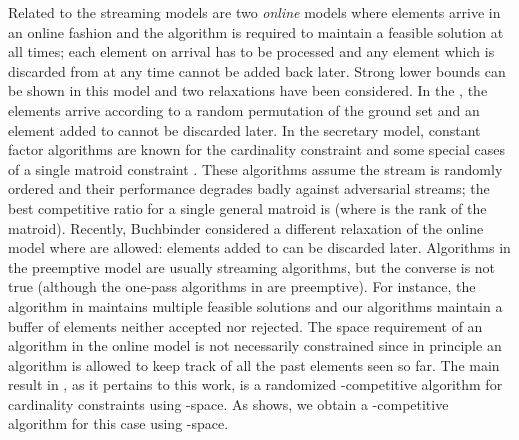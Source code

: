 \documentclass[oneside,letterpaper]{scrartcl} \usepackage{macros}
\begin{document}
Related to the streaming models are two {\em online} models where
elements arrive in an online fashion and the algorithm is required to
maintain a feasible solution  at all times; each element on arrival
has to be processed and any element which is discarded from  at any
time cannot be added back later. Strong lower bounds can be shown in
this model and two relaxations have been considered.  In the
, the elements arrive according to a random
permutation of the ground set and an element added to  cannot be
discarded later. In the secretary model, constant factor algorithms
are known for the cardinality constraint and some special cases of a
single matroid constraint \cite{grst-10,bhz-13}.  These algorithms
assume the stream is randomly ordered and their performance degrades
badly against adversarial streams; the best competitive ratio for a
single general matroid is  (where  is the rank of the
matroid).  Recently, Buchbinder \etal \cite{bfs-osmp-15} considered a
different relaxation of the online model where 
are allowed: elements added to  can be discarded later. Algorithms
in the preemptive model are usually streaming algorithms, but the
converse is not true (although the one-pass algorithms in
\cite{ck-smms-14} are preemptive). For instance, the algorithm in
\cite{bmkk-sso-14} maintains multiple feasible solutions and our
algorithms maintain a buffer of elements neither accepted nor
rejected. The space requirement of an algorithm in the online model is
not necessarily constrained since in principle an algorithm is allowed
to keep track of all the past elements seen so far. The main result in
\cite{bfs-osmp-15}, as it pertains to this work, is a randomized
-competitive algorithm for cardinality constraints using
-space. As  shows, we obtain a
-competitive algorithm for this case using -space.
\end{document}
